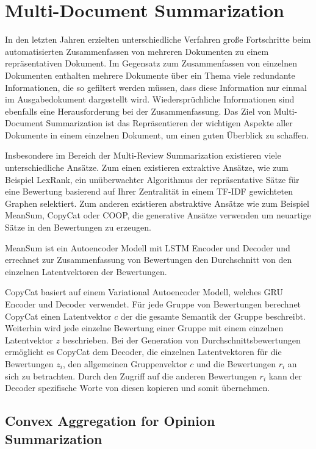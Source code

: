 \section{Multi-Document Summarization}
In den letzten Jahren erzielten unterschiedliche Verfahren große Fortschritte beim automatisierten Zusammenfassen von mehreren Dokumenten zu einem repräsentativen Dokument.
Im Gegensatz zum Zusammenfassen von einzelnen Dokumenten enthalten mehrere Dokumente über ein Thema viele redundante Informationen, die so gefiltert werden müssen, dass diese Information nur einmal im Ausgabedokument dargestellt wird.
Wiedersprüchliche Informationen sind ebenfalls eine Herausforderung bei der Zusammenfassung.
Das Ziel von Multi-Document Summarization ist das Repräsentieren der wichtigen Aspekte aller Dokumente in einem einzelnen Dokument, um einen guten Überblick zu schaffen.

Insbesondere im Bereich der Multi-Review Summarization existieren viele unterschiedliche Ansätze.
Zum einen existieren extraktive Ansätze, wie zum Beispiel LexRank, ein unüberwachter Algorithmus der repräsentative Sätze für eine Bewertung basierend auf Ihrer Zentralität in einem TF-IDF gewichteten Graphen selektiert.
Zum anderen existieren abstraktive Ansätze wie zum Beispiel MeanSum, CopyCat oder COOP, die generative Ansätze verwenden um neuartige Sätze in den Bewertungen zu erzeugen.

MeanSum ist ein Autoencoder Modell mit LSTM Encoder und Decoder und errechnet zur Zusammenfassung von Bewertungen den Durchschnitt von den einzelnen Latentvektoren der Bewertungen.

CopyCat basiert auf einem Variational Autoencoder Modell, welches GRU Encoder und Decoder verwendet. 
Für jede Gruppe von Bewertungen berechnet CopyCat einen Latentvektor $c$ der die gesamte Semantik der Gruppe beschreibt. 
Weiterhin wird jede einzelne Bewertung einer Gruppe mit einem einzelnen Latentvektor $z$ beschrieben.
Bei der Generation von Durchschnittsbewertungen ermöglicht es CopyCat dem Decoder, die einzelnen Latentvektoren für die Bewertungen $z_i$, den allgemeinen Gruppenvektor $c$ und die Bewertungen $r_i$ an sich zu betrachten.
Durch den Zugriff auf die anderen Bewertungen $r_i$ kann der Decoder spezifische Worte von diesen \glqq kopieren\grqq{}  und somit übernehmen.



\subsection{Convex Aggregation for Opinion Summarization}\raggedbottom


\pagebreak
